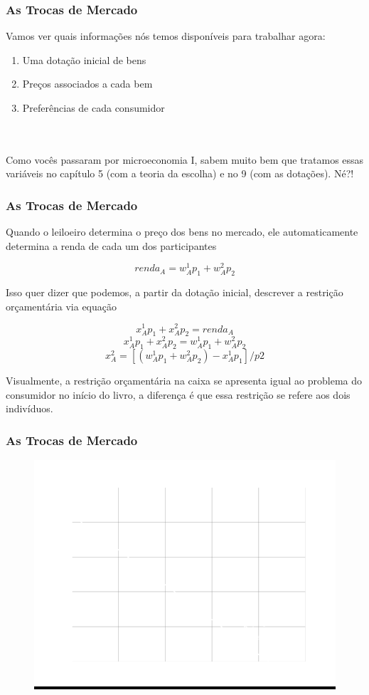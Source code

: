 \documentclass{beamer}[10]
\begin{document}
\begin{frame}
	\frametitle{As Trocas de Mercado}

	Vamos ver quais informações nós temos disponíveis para trabalhar agora:
	\begin{enumerate}
		\item Uma dotação inicial de bens
		\item Preços associados a cada bem
		\item Preferências de cada consumidor
	\end{enumerate}
	\ 
	\\~\\
	Como vocês passaram por microeconomia I, sabem muito bem que tratamos essas variáveis no capítulo 5 (com a teoria da escolha) e no 9 (com as dotações). Né?!

\end{frame}

\begin{frame}
	\frametitle{As Trocas de Mercado}

	Quando o leiloeiro determina o preço dos bens no mercado, ele automaticamente determina a renda de cada um dos participantes

	$$renda_A = w_A^1 p_1 + w_A^2 p_2$$

	Isso quer dizer que podemos, a partir da dotação inicial, descrever a restrição orçamentária via equação

	$$ x_A^1 p_1 + x_A^2 p_2 = renda_A$$
	$$ x_A^1 p_1 + x_A^2 p_2 = w_A^1 p_1 + w_A^2 p_2$$
	$$ x_A^2 = [(w_A^1 p_1 + w_A^2 p_2) - x_A^1 p_1]/p2$$

	Visualmente, a restrição orçamentária na caixa se apresenta igual ao problema do consumidor no início do livro, a diferença é que essa restrição se refere aos dois indivíduos.

\end{frame}

\begin{frame}
	\frametitle{As Trocas de Mercado}

	\begin{figure}[H]
		\centering
		\colorbox{black}{\includegraphics[scale=0.6]{cap32_4-caixa_edgeworth_1.png}}
	\end{figure}

\end{frame}
\end{document}
